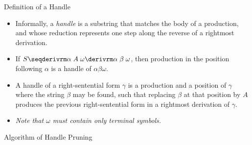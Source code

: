 \begin{bibunit}[apalike]
\begin{frame}{Definition of a Handle}
	\begin{itemize}
	\item Informally, a \emph{handle} is a substring that matches the body of a production, and whose reduction represents one step along the reverse of a rightmost derivation.
	\item If $S \seqderivrm \alpha\;A\;\omega \derivrm \alpha\;\beta\;\omega$, then production  in the position following $\alpha$ is a handle of $\alpha\beta\omega$.
		\begin{center}
		\end{center}
	\item A handle of a right-sentential form $\gamma$ is a production  and a position of $\gamma$ where the string $\beta$ may be found, such that replacing $\beta$ at that position by $A$ produces the previous right-sentential form in a rightmost derivation of $\gamma$.
	\item \emph{Note that $\omega$ must contain only terminal symbols.}
	\end{itemize}
\end{frame}

\begin{frame}[t]{Algorithm of Handle Pruning}
	\begin{scriptsize}
	\begin{myalgorithm}
	\end{myalgorithm}
	\end{scriptsize}
\end{frame}


\end{bibunit}
